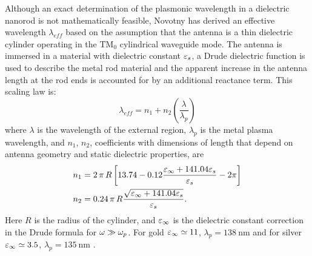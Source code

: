 \documentclass[11pt]{article}
\begin{document}
Although an exact determination of the plasmonic wavelength in a dielectric nanorod is not mathematically feasible, Novotny \cite{Novotny2007} has derived an effective wavelength $\lambda_{eff}$ based on the assumption that the antenna is a thin dielectric cylinder operating in the $\mathrm{TM}_0$ cylindrical waveguide mode. The antenna is immersed in a material with dielectric constant $\varepsilon_s$, a Drude dielectric function is used to describe the metal rod material and the apparent increase in the antenna length at the rod ends is accounted for by an additional reactance term. This scaling law is:
%
\begin{equation}
  \lambda_{eff} = n_1 + n_2\left( \frac{\lambda}{\lambda_p} \right)
  \label{eq:lambda_eff}
\end{equation}
%
where $\lambda$ is the wavelength of the external region, $\lambda_p$ is the metal plasma wavelength, and $n_1$, $n_2$, coefficients with dimensions of length that depend on antenna geometry and static dielectric properties, are
%
\begin{subequations}
  \begin{align}
    n_1 ={}& 2\, \pi\, R \left[ 13.74 - 0.12 \frac{\varepsilon_\infty + 141.04 \varepsilon_s}{\varepsilon_s} - 2\pi \right]
    \label{eq:n1}\\
    n_2 ={}& 0.24\, \pi\, R \frac{\sqrt{\varepsilon_\infty + 141.04 \varepsilon_s}}{\varepsilon_s}.
    \label{eq:n2}
  \end{align}
  \label{eq:ns}
\end{subequations}
%
Here $R$ is the radius of the cylinder, and $\varepsilon_{\infty}$ is the dielectric constant correction in the Drude formula for $\omega \gg \omega_p$. For gold $\varepsilon_\infty \simeq 11$, $\lambda_p = 138~\mathrm{nm}$ and for silver $\varepsilon_\infty \simeq 3.5$,
$\lambda_p = 135~\mathrm{nm}$ \cite{Novotny2007}.
\end{document}
